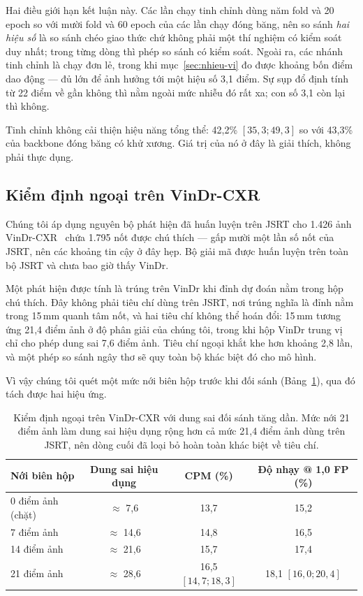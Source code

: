 \documentclass[12pt,a4paper]{article}
\begin{document}
Hai điều giới hạn kết luận này. Các lần chạy tinh chỉnh dùng năm fold và 20 epoch
so với mười fold và 60 epoch của các lần chạy đóng băng, nên so sánh \emph{hai
hiệu số} là so sánh chéo giao thức chứ không phải một thí nghiệm có kiểm soát duy
nhất; trong từng dòng thì phép so sánh có kiểm soát. Ngoài ra, các nhánh tinh
chỉnh là chạy đơn lẻ, trong khi mục~\ref{sec:nhieu-vi} đo được khoảng bốn điểm
dao động --- đủ lớn để ảnh hưởng tới một hiệu số 3,1 điểm. Sự sụp đổ định tính từ
22 điểm về gần không thì nằm ngoài mức nhiễu đó rất xa; con số 3,1 còn lại thì
không.

Tinh chỉnh không cải thiện hiệu năng tổng thể: 42,2\% $[35{,}3; 49{,}3]$ so với
43,3\% của backbone đóng băng có khử xương. Giá trị của nó ở đây là giải thích,
không phải thực dụng.

\subsection{Kiểm định ngoại trên VinDr-CXR}
\label{sec:ngoai-vi}

Chúng tôi áp dụng nguyên bộ phát hiện đã huấn luyện trên JSRT cho 1.426 ảnh
VinDr-CXR~\cite{nguyen2022vindr} chứa 1.795 nốt được chú thích --- gấp mười một
lần số nốt của JSRT, nên các khoảng tin cậy ở đây hẹp. Bộ giải mã được huấn luyện
trên toàn bộ JSRT và chưa bao giờ thấy VinDr.

Một phát hiện được tính là trúng trên VinDr khi đỉnh dự đoán nằm trong hộp chú
thích. Đây không phải tiêu chí dùng trên JSRT, nơi trúng nghĩa là đỉnh nằm trong
15\,mm quanh tâm nốt, và hai tiêu chí không thể hoán đổi: 15\,mm tương ứng 21,4
điểm ảnh ở độ phân giải của chúng tôi, trong khi hộp VinDr trung vị chỉ cho phép
dung sai 7,6 điểm ảnh. Tiêu chí ngoại khắt khe hơn khoảng 2,8 lần, và một phép so
sánh ngây thơ sẽ quy toàn bộ khác biệt đó cho mô hình.

Vì vậy chúng tôi quét một mức nới biên hộp trước khi đối sánh
(Bảng~\ref{tab:margin-vi}), qua đó tách được hai hiệu ứng.

\begin{table}[t]
\centering
\caption{Kiểm định ngoại trên VinDr-CXR với dung sai đối sánh tăng dần. Mức nới
21 điểm ảnh làm dung sai hiệu dụng rộng hơn cả mức 21,4 điểm ảnh dùng trên JSRT,
nên dòng cuối đã loại bỏ hoàn toàn khác biệt về tiêu chí.}
\label{tab:margin-vi}
\begin{tabular}{lccc}
\toprule
Nới biên hộp & Dung sai hiệu dụng & CPM (\%) & Độ nhạy @ 1,0 FP (\%) \\
\midrule
0 điểm ảnh (chặt) & $\approx$ 7,6 & 13,7 & 15,2 \\
7 điểm ảnh        & $\approx$ 14,6 & 14,8 & 16,5 \\
14 điểm ảnh       & $\approx$ 21,6 & 15,7 & 17,4 \\
21 điểm ảnh       & $\approx$ 28,6 & 16,5 $[14{,}7; 18{,}3]$ & 18,1 $[16{,}0; 20{,}4]$ \\
\bottomrule
\end{tabular}
\end{table}
\end{document}
